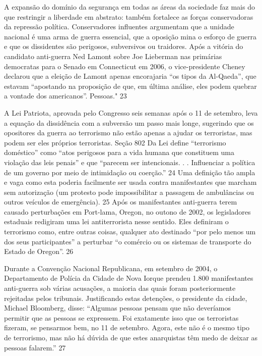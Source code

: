  
\par
 
A expansão do domínio da segurança em todas as áreas da sociedade faz mais do que restringir a liberdade em abstrato: também fortalece as forças conservadoras da repressão política. Conservadores influentes argumentam que a unidade nacional é uma arma de guerra essencial, que a oposição mina o esforço de guerra e que os dissidentes são perigosos, subversivos ou traidores. Após a vitória do candidato anti-guerra Ned Lamont sobre Joe Lieberman nas primárias democratas para o Senado em Connecticut em 2006, o vice-presidente Cheney declarou que a eleição de Lamont apenas encorajaria “os tipos da Al-Qaeda”, que estavam “apostando na proposição de que, em última análise, eles podem quebrar a vontade dos americanos”. Pessoas."
 {\color{blue} 23}  

 
\par
 
A Lei Patriota, aprovada pelo Congresso seis semanas após o 11 de setembro, leva a equação da dissidência com a subversão um passo mais longe, sugerindo que os opositores da guerra ao terrorismo não estão apenas a ajudar os terroristas, mas podem ser eles próprios terroristas. Seção
 {\color{blue} 802}  
Da Lei define “terrorismo doméstico” como “atos perigosos para a vida humana que constituem uma violação das leis penais” e que “parecem ser intencionais. . . Influenciar a política de um governo por meio de intimidação ou coerção.”
 {\color{blue} 24}  
Uma definição tão ampla e vaga como esta poderia facilmente ser usada contra manifestantes que marcham sem autorização (um protesto pode impossibilitar a passagem de ambulâncias ou outros veículos de emergência).
 {\color{blue} 25}  
Após os manifestantes anti-guerra terem causado perturbações em Port-lama, Oregon, no outono de 2002, os legisladores estaduais redigiram uma lei antiterrorista nesse sentido. Eles definiram o terrorismo como, entre outras coisas, qualquer ato destinado “por pelo menos um dos seus participantes” a perturbar “o comércio ou os sistemas de transporte do Estado de Oregon”.
 {\color{blue} 26}  

 
\par
 
Durante a Convenção Nacional Republicana, em setembro de 2004, o Departamento de Polícia da Cidade de Nova Iorque prendeu 1.800 manifestantes anti-guerra sob várias acusações, a maioria das quais foram posteriormente rejeitadas pelos tribunais. Justificando estas detenções, o presidente da cidade, Michael Bloomberg, disse: “Algumas pessoas pensam que não deveríamos permitir que as pessoas se expressem. Foi exatamente isso que os terroristas fizeram, se pensarmos bem, no 11 de setembro. Agora, este não é o mesmo tipo de terrorismo, mas não há dúvida de que estes anarquistas têm medo de deixar as pessoas falarem.”
 {\color{blue} 27}  

